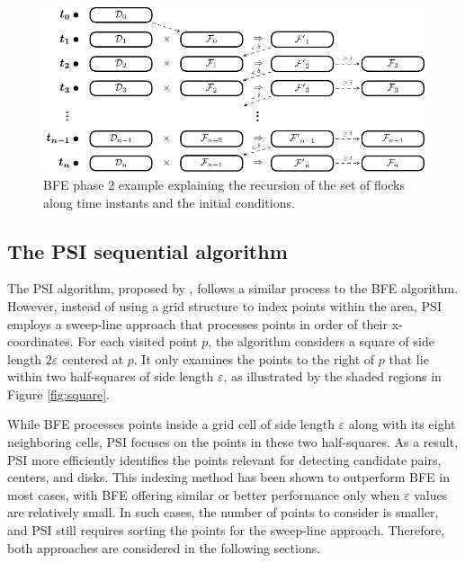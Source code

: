 \begin{figure}[!ht]
    \centering
    \includegraphics[width=\linewidth]{figures/FF_stages}
    \caption{BFE phase 2 example explaining the recursion of the set of flocks along time instants and the initial conditions.}\label{fig:FF_stages}
\end{figure}

\subsection{The PSI sequential algorithm}
The PSI algorithm, proposed by \cite{tanaka_improved_2016}, follows a similar process to the BFE algorithm. However, instead of using a grid structure to index points within the area, PSI employs a sweep-line approach that processes points in order of their x-coordinates. For each visited point $p$, the algorithm considers a square of side length $2\varepsilon$ centered at $p$. It only examines the points to the right of $p$ that lie within two half-squares of side length $\varepsilon$, as illustrated by the shaded regions in Figure \ref{fig:square}. 

While BFE processes points inside a grid cell of side length $\varepsilon$ along with its eight neighboring cells, PSI focuses on the points in these two half-squares. As a result, PSI more efficiently identifies the points relevant for detecting candidate pairs, centers, and disks. This indexing method has been shown to outperform BFE in most cases, with BFE offering similar or better performance only when $\varepsilon$ values are relatively small. In such cases, the number of points to consider is smaller, and PSI still requires sorting the points for the sweep-line approach. Therefore, both approaches are considered in the following sections.

